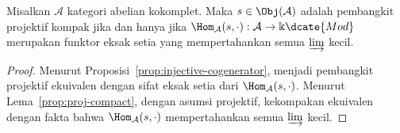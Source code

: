 \begin{proposition}\label{prop:proj-compact-gen}
	Misalkan $\mathcal{A}$ kategori abelian kokomplet. Maka
	$s\in\Obj(\mathcal{A})$ adalah pembangkit projektif kompak jika dan hanya
	jika $\Hom_{\mathcal{A}}(s,\mathord\cdot):
	\mathcal{A}\to\Bbbk\dcate{Mod}$ merupakan funktor eksak setia yang
	mempertahankan semua $\varinjlim$ kecil.
\end{proposition}
\begin{proof}
	Menurut Proposisi~\ref{prop:injective-cogenerator}, menjadi pembangkit
	projektif ekuivalen dengan sifat eksak setia dari
	$\Hom_{\mathcal{A}}(s,\mathord\cdot)$. Menurut
	Lema~\ref{prop:proj-compact}, dengan asumsi projektif, kekompakan ekuivalen
	dengan fakta bahwa $\Hom_{\mathcal{A}}(s,\mathord\cdot)$ mempertahankan
	semua $\varinjlim$ kecil.
\end{proof}

